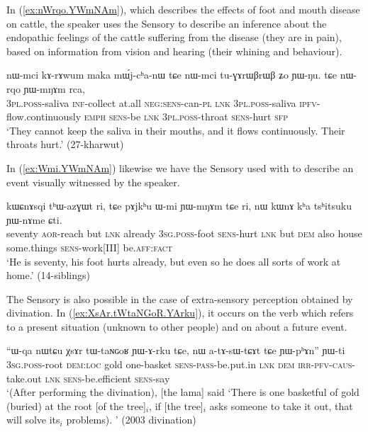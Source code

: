 In (\ref{ex:nWrqo.YWmNAm}), which describes the effects of foot and mouth disease on cattle, the speaker uses the Sensory to describe an inference about the endopathic feelings of the cattle suffering from the disease (they are in pain), based on information from vision and hearing (their whining and behaviour).

\begin{exe}
\ex \label{ex:nWrqo.YWmNAm}
\gll nɯ-mci kɤ-rɤwum maka mɯ́j-cʰa-nɯ tɕe nɯ-mci tu-ɣɤrɯβrɯβ ʑo ɲɯ-ŋu. tɕe nɯ-rqo ɲɯ-mŋɤm rca, \\
\textsc{3pl}.\textsc{poss}-saliva \textsc{inf}-collect at.all \textsc{neg}:\textsc{sens}-can-\textsc{pl} \textsc{lnk} \textsc{3pl}.\textsc{poss}-saliva \textsc{ipfv}-flow.continuously \textsc{emph} \textsc{sens}-be \textsc{lnk} \textsc{3pl}.\textsc{poss}-throat \textsc{sens}-hurt \textsc{sfp} \\
\glt `They cannot keep the saliva in their mouths, and it flows continuously. Their throats hurt.' (27-kharwut)
\end{exe}

In (\ref{ex:Wmi.YWmNAm}) likewise we have the Sensory used with  to describe an event visually witnessed by the speaker.

\begin{exe}
\ex \label{ex:Wmi.YWmNAm}
\gll kɯɕnɤsqi tʰɯ-azɣɯt ri, tɕe pɤjkʰu ɯ-mi ɲɯ-mŋɤm tɕe ri, nɯ kɯnɤ kʰa tsʰitsuku ɲɯ-nɤme ɕti. \\
seventy \textsc{aor}-reach but \textsc{lnk} already \textsc{3sg}.\textsc{poss}-foot \textsc{sens}-hurt \textsc{lnk} but \textsc{dem} also house some.things \textsc{sens}-work[III] be.\textsc{aff}:\textsc{fact} \\
\glt `He is seventy, his foot hurts already, but even so he does all sorts of work at home.' (14-siblings)
\end{exe}
 
The Sensory is also possible in the case of extra-sensory perception obtained by divination. In (\ref{ex:XsAr.tWtaNGoR.YArku}), it occurs on the verb  which refers to a present situation (unknown to other people) and on  about a future event.
 
\begin{exe}
\ex \label{ex:XsAr.tWtaNGoR.YArku}
\gll ``ɯ-qa nɯtɕu χsɤr tɯ-taɴɢoʁ ɲɯ-ɤ-rku tɕe, nɯ a-tɤ-sɯ-tɕɤt tɕe ɲɯ-pʰɤn'' ɲɯ-ti \\
\textsc{3sg}.\textsc{poss}-root \textsc{dem}:\textsc{loc} gold one-basket \textsc{sens}-\textsc{pass}-be.put.in \textsc{lnk} \textsc{dem} \textsc{irr}-\textsc{pfv}-\textsc{caus}-take.out \textsc{lnk} \textsc{sens}-be.efficient \textsc{sens}-say \\
\glt `(After performing the divination), [the lama] said `There is one basketful of gold (buried) at the root [of the tree]$_i$, if [the tree]$_i$ asks someone to take it out, that will solve its$_i$ problems). ' (2003 divination)
\end{exe}

